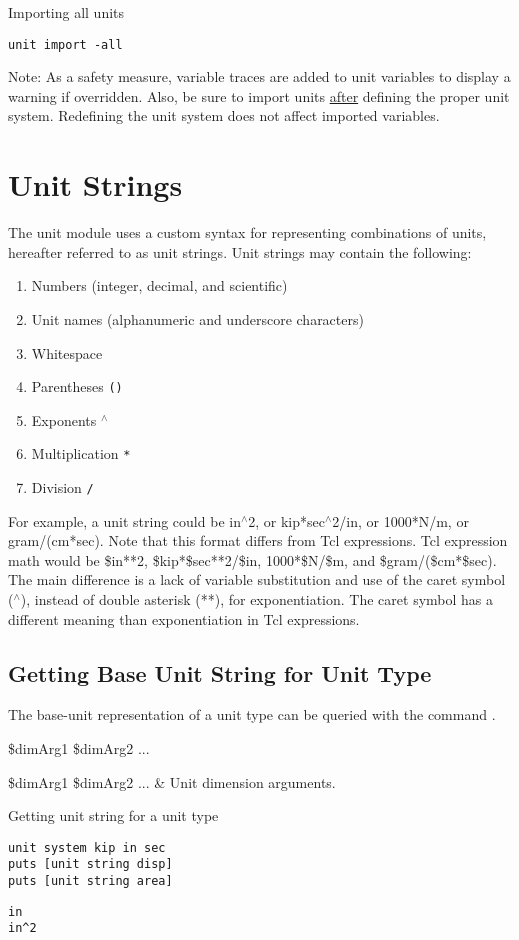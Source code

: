\documentclass{article}
\newcommand{\caret}{$^\wedge$}
\begin{document}
\begin{example}{Importing all units}
\begin{lstlisting}
unit import -all
\end{lstlisting}
\end{example}
Note: As a safety measure, variable traces are added to unit variables to display a warning if overridden.
Also, be sure to import units \underline{after} defining the proper unit system. 
Redefining the unit system does not affect imported variables.
\clearpage
\section{Unit Strings}
The unit module uses a custom syntax for representing combinations of units, hereafter referred to as unit strings.
Unit strings may contain the following:
\begin{enumerate}[itemsep=0em]
\item Numbers (integer, decimal, and scientific)
\item Unit names (alphanumeric and underscore characters)
\item Whitespace
\item Parentheses \texttt{()}
\item Exponents \texttt{\caret}
\item Multiplication \texttt{*}
\item Division \texttt{/}
\end{enumerate}
For example, a unit string could be in\caret2, or kip*sec\caret2/in, or 1000*N/m, or gram/(cm*sec). Note that this format differs from Tcl expressions. Tcl expression math would be \$in**2, \$kip*\$sec**2/\$in, 1000*\$N/\$m, and \$gram/(\$cm*\$sec). The main difference is a lack of variable substitution and use of the caret symbol (\caret), instead of double asterisk (**), for exponentiation. The caret symbol has a different meaning than exponentiation in Tcl expressions.
\subsection{Getting Base Unit String for Unit Type}
The base-unit representation of a unit type can be queried with the command . 
\begin{syntax}
 \$dimArg1 \$dimArg2 ...
\end{syntax}
\begin{args}
\$dimArg1 \$dimArg2 ... & Unit dimension arguments.
\end{args}
\begin{example}{Getting unit string for a unit type}
\begin{lstlisting}
unit system kip in sec
puts [unit string disp]
puts [unit string area]
\end{lstlisting}
\tcblower
\begin{lstlisting}
in
in^2
\end{lstlisting}
\end{example}
\clearpage
\end{document}
